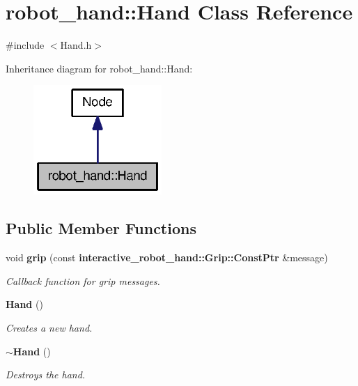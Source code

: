 \section{robot\-\_\-hand\-:\-:Hand Class Reference}
\label{classrobot__hand_1_1Hand}


{\ttfamily \#include $<$Hand.\-h$>$}



Inheritance diagram for robot\-\_\-hand\-:\-:Hand\-:\nopagebreak
\begin{figure}[H]
\begin{center}
\leavevmode
\includegraphics[width=138pt]{classrobot__hand_1_1Hand__inherit__graph}
\end{center}
\end{figure}
\subsection*{Public Member Functions}
\begin{DoxyCompactItemize}
\item 
void {\bf grip} (const {\bf interactive\-\_\-robot\-\_\-hand\-::\-Grip\-::\-Const\-Ptr} \&message)
\begin{DoxyCompactList}\small\item\em Callback function for grip messages. \end{DoxyCompactList}\item 
{\bf Hand} ()
\begin{DoxyCompactList}\small\item\em Creates a new hand. \end{DoxyCompactList}\item 
{\bf $\sim$\-Hand} ()
\begin{DoxyCompactList}\small\item\em Destroys the hand. \end{DoxyCompactList}\end{DoxyCompactItemize}
